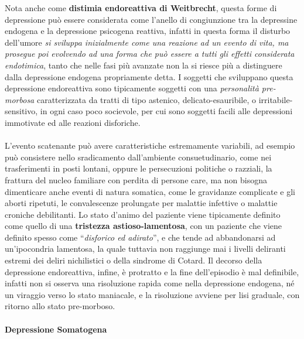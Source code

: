 Nota anche come \textbf{distimia endoreattiva di Weitbrecht}, questa
forme di depressione può essere considerata come l'anello di
congiunzione tra la depressine endogena e la depressione psicogena
reattiva, infatti in questa forma il disturbo dell'umore \emph{si
sviluppa inizialmente come una reazione ad un evento di vita, ma
prosegue poi evolvendo ad una forma che può essere a tutti gli effetti
considerata endotimica}, tanto che nelle fasi più avanzate non la si
riesce più a distinguere dalla depressione endogena propriamente detta.
I soggetti che sviluppano questa depressione endoreattiva sono
tipicamente soggetti con una \emph{personalità pre-morbosa}
caratterizzata da tratti di tipo astenico, delicato-esauribile, o
irritabile-sensitivo, in ogni caso poco socievole, per cui sono soggetti
facili alle depressioni immotivate ed alle reazioni disforiche.
\\\\
L'evento scatenante può avere caratteristiche estremamente variabili, ad
esempio può consistere nello sradicamento dall'ambiente consuetudinario,
come nei trasferimenti in posti lontani, oppure le persecuzioni
politiche o razziali, la frattura del nucleo familiare con perdita di
persone care, ma non bisogna dimenticare anche eventi di natura
somatica, come le gravidanze complicate e gli aborti ripetuti, le
convalescenze prolungate per malattie infettive o malattie croniche
debilitanti. Lo stato d'animo del paziente viene tipicamente definito
come quello di una \textbf{tristezza astioso-lamentosa}, con un paziente
che viene definito spesso come ``\emph{disforico ed adirato}'', e che
tende ad abbandonarsi ad un'ipocondria lamentosa, la quale tuttavia non
raggiunge mai i livelli deliranti estremi dei deliri nichilistici o
della sindrome di Cotard. Il decorso della depressione endoreattiva,
infine, è protratto e la fine dell'episodio è mal definibile, infatti
non si osserva una risoluzione rapida come nella depressione endogena,
né un viraggio verso lo stato maniacale, e la risoluzione avviene per
lisi graduale, con ritorno allo stato pre-morboso.

\paragraph{Depressione Somatogena}

